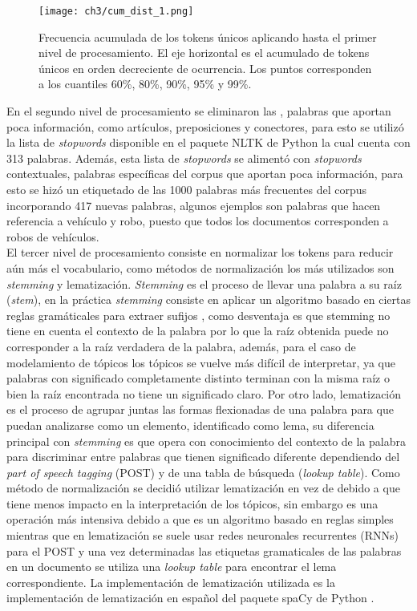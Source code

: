 \documentclass[letterpaper,12pt,oneside]{book} %
\begin{document}
\begin{figure}
    \centering
    \texttt{[image: ch3/cum\_dist\_1.png]}
    \caption{Frecuencia acumulada de los tokens únicos aplicando hasta el primer nivel de procesamiento. El eje horizontal es el acumulado de tokens únicos en orden decreciente de ocurrencia. Los puntos corresponden a los cuantiles 60\%, 80\%, 90\%, 95\% y 99\%.}
    \label{img:cum_dist1}
\end{figure}

En el segundo nivel de procesamiento se eliminaron las , palabras que aportan poca información, como artículos, preposiciones y conectores, para esto se utilizó la lista de \textit{stopwords} disponible en el paquete NLTK de Python \citep{bird2009natural} la cual cuenta con 313 palabras. Además, esta lista de \textit{stopwords} se alimentó con \textit{stopwords} contextuales, palabras específicas del corpus que aportan poca información, para esto se hizó un etiquetado de las 1000 palabras más frecuentes del corpus incorporando 417 nuevas palabras, algunos ejemplos son palabras que hacen referencia a vehículo y robo, puesto que todos los documentos corresponden a robos de vehículos.\\

El tercer nivel de procesamiento consiste en normalizar los tokens para reducir aún más el vocabulario, como métodos de normalización los más utilizados son \textit{stemming}  y lematización. \textit{Stemming} es el proceso de llevar una palabra a su raíz (\textit{stem}), en la práctica \textit{stemming} consiste en aplicar un algoritmo basado en ciertas reglas gramáticales para extraer sufijos \citep{porter1980algorithm}, como desventaja es que stemming no tiene en cuenta el contexto de la palabra por lo que la raíz obtenida puede no corresponder a la raíz verdadera de la palabra, además, para el caso de modelamiento de tópicos los tópicos se vuelve más difícil de interpretar, ya que palabras con significado completamente distinto terminan con la misma raíz o bien la raíz encontrada no tiene un significado claro. Por otro lado, lematización es el proceso de agrupar juntas las formas flexionadas de una palabra para que puedan analizarse como un elemento, identificado como lema, su diferencia principal con \textit{stemming} es que opera con conocimiento del contexto de la palabra para discriminar entre palabras que tienen significado diferente dependiendo del \textit{part of speech tagging} (POST) y de una tabla de búsqueda (\textit{lookup table}). Como método de normalización se decidió utilizar lematización en vez de  debido a que tiene menos impacto en la interpretación de los tópicos, sin embargo es una operación más intensiva debido a que  es un algoritmo basado en reglas simples mientras que en lematización se suele usar redes neuronales recurrentes (RNNs) para el POST y una vez determinadas las etiquetas gramaticales de las palabras en un documento se utiliza una \textit{lookup table} para encontrar el lema correspondiente. La implementación de lematización utilizada es la implementación de lematización en español del paquete spaCy de Python \citep{spacy2}.\\
\end{document}
